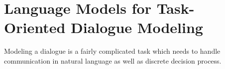 \chapter{Language Models for Task-Oriented Dialogue Modeling}
\label{chap:conclusion}
Modeling a dialogue is a fairly complicated task which needs to handle communication in natural language as well as  discrete decision process.
